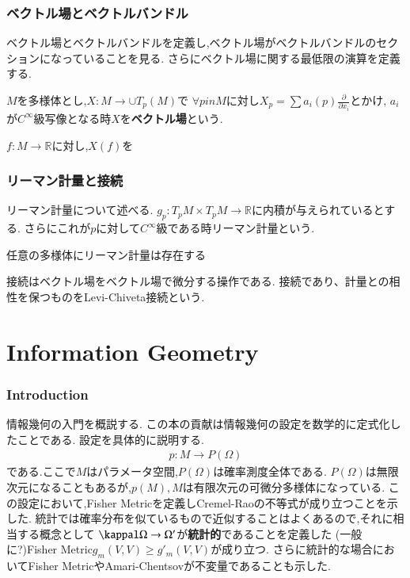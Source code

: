 \documentclass[dvipdfmx]{jarticle}
\begin{document}
\section{ベクトル場とベクトルバンドル}
ベクトル場とベクトルバンドルを定義し,ベクトル場がベクトルバンドルのセクションになっていることを見る.
さらにベクトル場に関する最低限の演算を定義する.

\begin{screen}
\begin{dfn}
$M$を多様体とし,$X:M \to \cup T_p(M)$で
$\forall p in M$に対し$X_p = \sum a_i(p) \frac{\partial}{\partial x_i}$とかけ,
$a_i$が$C^{\infty}$級写像となる時$X$を\textbf{ベクトル場}という.
\end{dfn}
\end{screen}

$f:M \to \mathbb{R}$に対し,$X(f)$を

\section{リーマン計量と接続}
リーマン計量について述べる.
$g_p: T_pM \times T_pM \to \mathbb{R}$に内積が与えられているとする.
さらにこれが$p$に対して$C^{\infty}$級である時リーマン計量という.

\begin{thm}
任意の多様体にリーマン計量は存在する
\end{thm}


接続はベクトル場をベクトル場で微分する操作である.
接続であり、計量との相性を保つものをLevi-Chiveta接続という.

\part{Information Geometry}
\section{Introduction}
情報幾何の入門を概説する.
この本の貢献は情報幾何の設定を数学的に定式化したことである.
設定を具体的に説明する.
\begin{align*}
p: M \to P(\Omega)
\end{align*}
である.ここで$M$はパラメータ空間,$P(\Omega)$は確率測度全体である.
$P(\Omega)$は無限次元になることもあるが,$p(M),M$は有限次元の可微分多様体になっている.
この設定において,Fisher Metricを定義しCremel-Raoの不等式が成り立つことを示した.
統計では確率分布を似ているもので近似することはよくあるので,それに相当する概念として
$\kappal \Omega \to \Omega'$が\textbf{統計的}であることを定義した
(一般に?)Fisher Metric$g_m(V, V) \ge g'_m(V, V)$が成り立つ.
さらに統計的な場合においてFisher MetricやAmari-Chentsovが不変量であることも示した.
\end{document}
